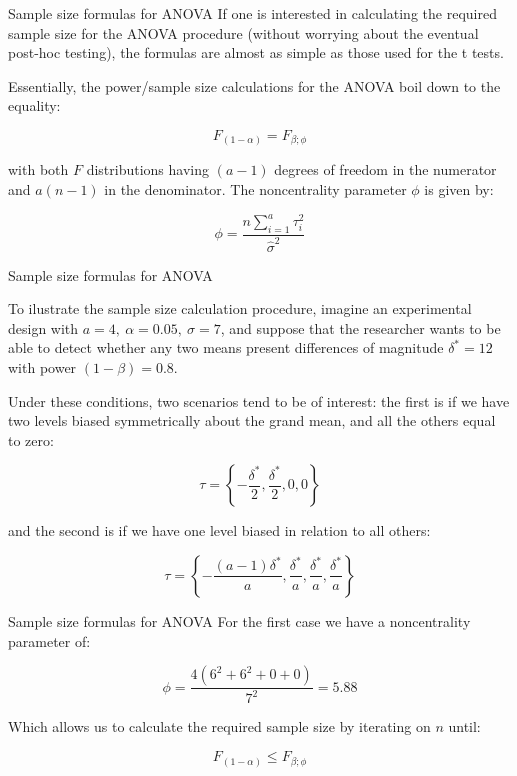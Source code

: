 \begin{frame}{Sample size formulas for ANOVA}
If one is interested in calculating the required sample size for the ANOVA procedure (without worrying about the eventual post-hoc testing), the formulas are almost as simple as those used for the t tests.\bigskip

Essentially, the power/sample size calculations for the ANOVA boil down to the equality:

\begin{equation*}
F_{(1-\alpha)} = F_{\beta;\phi}
\end{equation*}

with both $F$ distributions having $(a-1)$ degrees of freedom in the numerator and $a(n-1)$ in the denominator. The noncentrality parameter $\phi$ is given by:

\begin{equation*}
\phi = \frac{n\sum\limits_{i=1}^{a}\tau_i^2}{\hat{\sigma}^2}
\end{equation*}
\end{frame}

\begin{frame}{Sample size formulas for ANOVA}

To ilustrate the sample size calculation procedure, imagine an experimental design with $a = 4,\ \alpha = 0.05,\ \hat{\sigma} = 7$, and suppose that the researcher wants to be able to detect whether any two means present differences of magnitude $\delta^* = 12$ with power $(1-\beta)=0.8$.\bigskip

Under these conditions, two scenarios tend to be of interest: the first is if we have two levels biased symmetrically about the grand mean, and all the others equal to zero:

$$ \tau = \left\{-\frac{\delta^*}{2}, \frac{\delta^*}{2}, 0, 0\right\}$$

\noindent and the second is if we have one level biased in relation to all others:

$$ \tau = \left\{-\frac{(a-1)\delta^*}{a}, \frac{\delta^*}{a}, \frac{\delta^*}{a}, \frac{\delta^*}{a}\right\}$$
\end{frame}

\begin{frame}{Sample size formulas for ANOVA}
For the first case we have a noncentrality parameter of:

$$\phi = \frac{4\left(6^2+6^2+0+0\right)}{7^2} = 5.88$$

Which allows us to calculate the required sample size by iterating on $n$ until:

$$F_{(1-\alpha)} \leq F_{\beta;\phi}$$

\end{frame}

